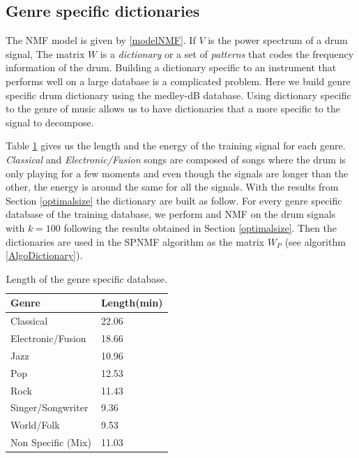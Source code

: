 \documentclass{article}
\begin{document}
\subsection{Genre specific dictionaries}\label{genrespecdict}

The NMF model is given by \ref{modelNMF}. If $V$ is the power spectrum of a drum signal, The matrix $W$ is a {\em dictionary} or a set of {\em patterns} that codes the frequency information of the drum. Building a dictionary specific to an instrument that performs well on a large database is a complicated problem. Here we build genre specific drum dictionary using the medley-dB database. Using dictionary specific to the genre of music allows us to have dictionaries that a more specific to the signal to decompose.

Table \ref{lengthDict} gives us the length and the energy of the training signal for each genre. \emph{Classical} and \emph{Electronic/Fusion} songs are composed of songs where the drum is only playing for a few moments and even though the signals are longer than the other, the energy is around the same for all the signals. With the results from Section \ref{optimalsize} the dictionary are built as follow. For every genre specific database of the training database, we perform and NMF on the drum signals with $k=100$ following the results obtained in Section \ref{optimalsize}. Then the dictionaries are used in the SPNMF algorithm as the matrix $W_P$ (see algorithm \ref{AlgoDictionary}).

\begin{table}
   
	\centering 
   \begin{tabular}{|l|l|}
\hline   
Genre & Length(min) \\
\hline
Classical  & 22.06  \\
\hline
Electronic/Fusion & 18.66 \\
\hline
Jazz & 10.96 \\
\hline
Pop &  12.53 \\
\hline
Rock & 11.43 \\
\hline
Singer/Songwriter & 9.36 \\
\hline
World/Folk & 9.53 \\
\hline
Non Specific (Mix) & 11.03  \\
\hline
  
\end{tabular} 
\caption{\label{lengthDict} Length of the genre specific database.}
\end{table}
\end{document}
